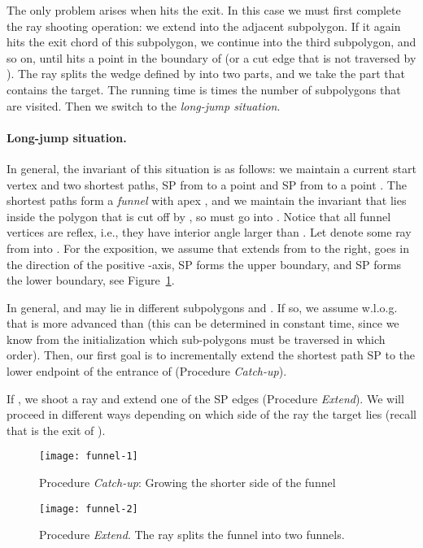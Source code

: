 \documentclass[11pt,a4paper]{article}
\begin{document}
The only problem arises when  hits the exit.
In this case we must first complete the ray shooting operation:
we extend  into the adjacent subpolygon. If it again hits the
exit chord of this subpolygon, we continue into the third subpolygon, and so on,
until  hits a point  in the boundary of  (or a cut edge that is not
traversed by ). The ray  splits the wedge defined by 
into two parts, and we take the part that contains the target.
The running time is  times the number of subpolygons that are visited.
Then we switch to the \emph{long-jump situation}.
\paragraph{Long-jump situation.}
In general, the invariant of this situation is as follows:
we  maintain a current start vertex  and two
shortest paths, SP from  to a point 
and SP from  to a point .
The shortest paths form a \emph{funnel}  with apex ,
and we maintain the invariant that  lies inside the polygon 
that is cut off by , so  must go into . Notice that all
funnel vertices are reflex, i.e., they have
interior angle larger than .
Let  denote some ray from  into .
For the exposition, we assume that  extends from
 to the right,  goes in the direction of the positive -axis,
SP forms the upper boundary, and SP forms the lower boundary, see
Figure~\ref{fig:funnel-1}.

In general,  and  may lie in different subpolygons 
and . If so, we  assume w.l.o.g.
that  is more advanced than 
(this can be determined in constant time, since we know from the initialization
which sub-polygons must be traversed in which order). Then, our first goal is to
 incrementally extend the shortest path SP to the
lower endpoint of the entrance of  (Procedure \emph{Catch-up}).

If , we shoot a ray  and extend one of the
SP edges (Procedure \emph{Extend}). We will proceed in different
ways depending on which side of the ray  the target 
lies (recall that  is the exit of ).

\begin{figure}[htb]
\centerline{\texttt{[image: funnel-1]}}
\caption{Procedure \emph{Catch-up}: Growing the shorter side of the funnel}
\label{fig:funnel-1}
\end{figure}

\begin{figure}[htb]
\centerline{\texttt{[image: funnel-2]}}
\caption{Procedure \emph{Extend}. The ray  splits the funnel into two funnels.}
\label{funnel-2}
\end{figure}
\end{document}
